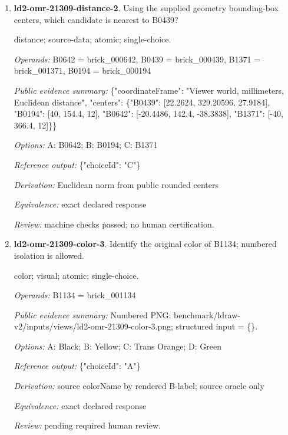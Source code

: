 \begin{enumerate}
\par{\small shape-match; visual; atomic; single-choice.\par\textit{Operands:} B0454 = brick\_000454, B0536 = brick\_000536, B0843 = brick\_000843, B0439 = brick\_000439, B1793 = brick\_001793\par\textit{Public evidence summary:} Numbered PNG: benchmark/ldraw-v2/inputs/views/ld2-omr-21309-shape-match-2.png; structured input = \{\}.\par\textit{Options:} A: B1793; B: B0843; C: B0454; D: B0536\par\textit{Reference output:} \{"choiceId": "C"\}\par\textit{Derivation:} source partNumber equality across labeled candidates; source oracle only\par\textit{Equivalence:} same source partNumber; ignore color and pose; perceptual equivalence pending\par\textit{Review:} pending required human review.}
\item \textbf{ld2-omr-21309-distance-2}. Using the supplied geometry bounding-box centers, which candidate is nearest to B0439?
\par{\small distance; source-data; atomic; single-choice.\par\textit{Operands:} B0642 = brick\_000642, B0439 = brick\_000439, B1371 = brick\_001371, B0194 = brick\_000194\par\textit{Public evidence summary:} \{"coordinateFrame": "Viewer world, millimeters, Euclidean distance", "centers": \{"B0439": [22.2624, 329.20596, 27.9184], "B0194": [40, 154.4, 12], "B0642": [-20.4486, 142.4, -38.3838], "B1371": [-40, 366.4, 12]\}\}\par\textit{Options:} A: B0642; B: B0194; C: B1371\par\textit{Reference output:} \{"choiceId": "C"\}\par\textit{Derivation:} Euclidean norm from public rounded centers\par\textit{Equivalence:} exact declared response\par\textit{Review:} machine checks passed; no human certification.}
\item \textbf{ld2-omr-21309-color-3}. Identify the original color of B1134; numbered isolation is allowed.
\par{\small color; visual; atomic; single-choice.\par\textit{Operands:} B1134 = brick\_001134\par\textit{Public evidence summary:} Numbered PNG: benchmark/ldraw-v2/inputs/views/ld2-omr-21309-color-3.png; structured input = \{\}.\par\textit{Options:} A: Black; B: Yellow; C: Trans Orange; D: Green\par\textit{Reference output:} \{"choiceId": "A"\}\par\textit{Derivation:} source colorName by rendered B-label; source oracle only\par\textit{Equivalence:} exact declared response\par\textit{Review:} pending required human review.}

\end{enumerate}
